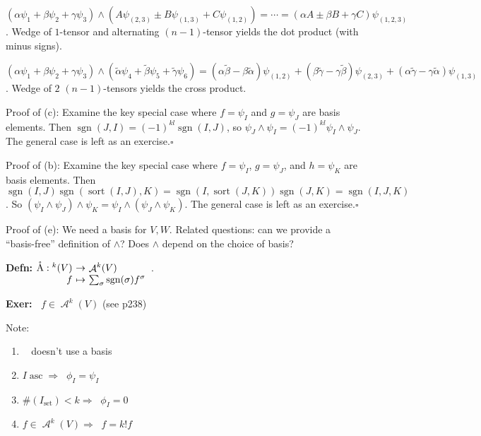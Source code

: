 \documentclass[10pt,letterpaper]{article}
\newcommand{\n}{\hfill\break}
\newcommand{\defn}[1]{\par\noindent\settowidth{\hangindent}{\textbf{Defn: }}\textbf{Defn: }#1\n}
\newcommand{\exer}[1]{\par\noindent\settowidth{\hangindent}{\textbf{Exer: }}\textbf{Exer: }#1\n}
\newcommand{\proven}{\;$\square$\n}
\DeclareMathOperator{\sgn}{sgn}
\newcommand{\map}[4]{\!\!\!\begin{array}[t]{rcl}#1 & \!\!\!\!\to & \!\!\!\!#2\\ #3 & \!\!\!\!\mapsto & \!\!\!\!#4\end{array}}
\let\L\relax
\DeclareMathOperator{\L}{\mathscr{L}}
\DeclareMathOperator{\A}{\mathcal{A}}
\DeclareMathOperator{\asc}{asc}
\DeclareMathOperator{\asSet}{set}
\DeclareMathOperator{\sort}{sort}
\DeclareMathOperator{\ringA}{\mathring{A}}
\begin{document}
\par\noindent $(\alpha\psi_{1}+\beta\psi_{2}+\gamma\psi_{3})\wedge(A\psi_{(2,3)}\pm{}B\psi_{(1,3)}+C\psi_{(1,2)})=\cdots=(\alpha{}A\pm\beta{}B+\gamma{}C)\psi_{(1,2,3)}$.\n
Wedge of $1$-tensor and alternating $(n-1)$-tensor yields the dot product (with minus signs).\n

\par\noindent $(\alpha\psi_{1}+\beta\psi_{2}+\gamma\psi_{3})\wedge(\tilde{\alpha}\psi_{4}+\tilde{\beta}\psi_{5}+\tilde{\gamma}\psi_{6})=(\alpha\tilde{\beta}-\beta\tilde{\alpha})\psi_{(1,2)}+(\beta\tilde{\gamma}-\gamma\tilde{\beta})\psi_{(2,3)}+(\alpha\tilde{\gamma}-\gamma\tilde{\alpha})\psi_{(1,3)}$.\n
Wedge of $2$ $(n-1)$-tensors yields the cross product.\n

\par\noindent Proof of (c): Examine the key special case where $f=\psi_{I}$ and $g=\psi_{J}$ are basis elements.\n
Then $\sgn(J,I)=(-1)^{kl}\sgn(I,J)$, so $\psi_{J}\wedge\psi_{I}=(-1)^{kl}\psi_{I}\wedge\psi_{J}$. The general case is left as an exercise.\proven

\par\noindent Proof of (b): Examine the key special case where $f=\psi_{I}$, $g=\psi_{J}$, and $h=\psi_{K}$ are basis elements.\n
Then $\sgn(I,J)\sgn(\sort(I,J),K)=\sgn(I,\sort(J,K))\sgn(J,K)=\sgn(I,J,K)$.\n
So $(\psi_{I}\wedge\psi_{J})\wedge\psi_{K}=\psi_{I}\wedge(\psi_{J}\wedge\psi_{K})$. The general case is left as an exercise.\proven

\par\noindent Proof of (e): We need a basis for $V,W$. Related questions: can we provide a ``basis-free'' definition of $\wedge$? Does $\wedge$ depend on the choice of basis?\n

\defn{$\ringA:\map{\L^{k}(V)}{\A^{k}(V)}{f}{\sum_{\sigma}\sgn(\sigma)f^{\sigma}}$.}

\exer{$\ringA{}f\in\A^{k}(V)$ (see p238)}

\par\noindent Note:
\begin{enumerate}[label=\alph*),topsep=0pt,itemsep=0pt]
	\item $\ringA$ doesn't use a basis
	\item $I\asc\Rightarrow\ringA\phi_{I}=\psi_{I}$
	\item $\#(I_{\asSet})<k\Rightarrow\ringA\phi_{I}=0$
	\item $f\in\A^{k}(V)\Rightarrow\ringA{}f=k!f$
\end{enumerate}
\end{document}
